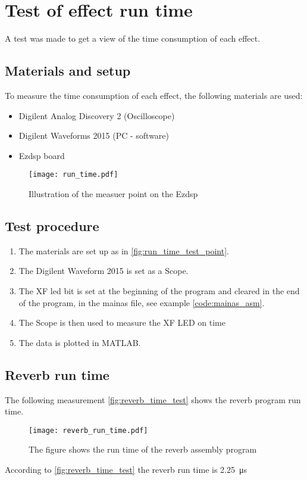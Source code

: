 \chapter{Test of effect run time}\label{app:effect_run_time}
A test was made to get a view of the time consumption of each effect.

\section*{Materials and setup}
To measure the time consumption of each effect, the following materials are used:
\begin{itemize}
\item Digilent Analog Discovery 2 (Oscilloscope)
\item Digilent Waveforms 2015 (PC - software)
\item Ezdsp board
\end{itemize}


\begin{figure}[htbp!]
	\centering
		\texttt{[image: run\_time.pdf]}
		\caption{Illustration of the measuer point on the Ezdsp}
		\label{fig:run_time_test_point}
\end{figure}


\section*{Test procedure}
\begin{enumerate}
\item The materials are set up as in \autoref{fig:run_time_test_point}.
\item The Digilent Waveform 2015 is set as a Scope.
\item  The XF led bit is set at the beginning of the program and cleared in the end of the program, in the mainas file, see example \autoref{code:mainas_asm}.
\item  The Scope is then used to measure the XF LED on time 
\item The data is plotted in MATLAB.
\end{enumerate}

\section*{Reverb run time}
The following measurement \autoref{fig:reverb_time_test} shows the \gls{reverb} program run time.
\begin{figure}[htbp!]
	\centering
		\texttt{[image: reverb\_run\_time.pdf]}
		\caption{The figure shows the run time of the \gls{reverb} assembly program}
		\label{fig:reverb_time_test}
\end{figure}

According to \autoref{fig:reverb_time_test} the \gls{reverb} run time is \SI{2.25}{\micro\second}
